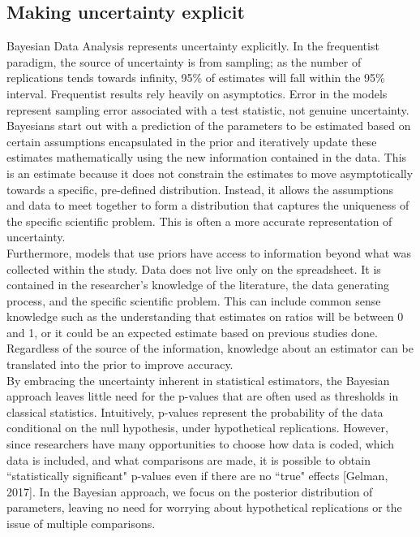 \documentclass{article}
\begin{document}
\subsection{Making uncertainty explicit}
Bayesian Data Analysis represents uncertainty explicitly. In the frequentist paradigm, the source of uncertainty is from sampling; as the number of replications tends towards infinity, 95\% of estimates will fall within the 95\% interval. Frequentist results rely heavily on asymptotics. Error in the models represent sampling error associated with a test statistic, not genuine uncertainty. Bayesians start out with a prediction of the parameters to be estimated based on certain assumptions encapsulated in the prior and iteratively update these estimates mathematically using the new information contained in the data. This is an estimate because it does not constrain the estimates to move asymptotically towards a specific, pre-defined distribution. Instead, it allows the assumptions and data to meet together to form a distribution that captures the uniqueness of the specific scientific problem. This is often a more accurate representation of uncertainty.\\
Furthermore, models that use priors have access to information beyond what was collected within the study. Data does not live only on the spreadsheet. It is contained in the researcher's knowledge of the literature, the data generating process, and the specific scientific problem. This can include common sense knowledge such as the understanding that estimates on ratios will be between 0 and 1, or it could be an expected estimate based on previous studies done. Regardless of the source of the information, knowledge about an estimator can be translated into the prior to improve accuracy. \\ 
By embracing the uncertainty inherent in statistical estimators, the Bayesian approach leaves little need for the p-values that are often used as thresholds in classical statistics.  Intuitively, p-values represent the probability of the data conditional on the null hypothesis, under hypothetical replications.  However, since researchers have many opportunities to choose how data is coded, which data is included, and what comparisons are made, it is possible to obtain ``statistically significant" p-values even if there are no ``true" effects [Gelman, 2017].  In the Bayesian approach, we focus on the posterior distribution of parameters, leaving no need for worrying about hypothetical replications or the issue of multiple comparisons.
\end{document}

